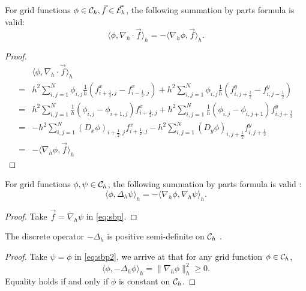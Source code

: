 \begin{proposition}
\label{prop:sbp}
    For grid functions $\phi \in{\mathcal{C}_h},\vec{f}\in {\vec{\mathcal{E}_h}}$, the following summation by parts formula is valid:
    \begin{equation}\label{eq:sbp}
        \langle \phi,\nabla_h \cdot \vec{f}\rangle_h=
        -\langle \nabla_h\phi, \vec{f}\rangle_h.
    \end{equation}
\end{proposition}
\begin{proof}
\begin{equation}
    \begin{aligned}
        &\langle \phi,\nabla_h \cdot \vec{f}\rangle_h \\    
        =&h^2\sum_{i,j=1}^N  \phi_{i,j}\frac{1}{h}(f^x_{i+\frac{1}{2},j}-f^x_{i-\frac{1}{2},j}
        )+h^2\sum_{i,j=1}^N \phi_{i,j}\frac{1}{h}(f^y_{i,j+\frac{1}{2}}-f^y_{i,j-\frac{1}{2}}
        )\\
        =&h^2\sum_{i,j=1}^N \frac{1}{h}(\phi_{i,j}-\phi_{i+1,j})f^x_{i+\frac{1}{2},j}+h^2\sum_{i,j=1}^N \frac{1}{h}(\phi_{i,j}-\phi_{i,j+1})f^y_{i,j+\frac{1}{2}}\\
        =&-h^2\sum_{i,j=1}^N (D_x \phi)_{i+\frac{1}{2},j}
        f^x_{i+\frac{1}{2},j}
        -h^2\sum_{i,j=1}^N (D_y \phi)_{i,j+\frac{1}{2}}
        f^y_{i,j+\frac{1}{2}}\\
        =&-\langle \nabla_h \phi, \vec{f} \rangle_h
    \end{aligned}
\end{equation}
    
\end{proof}
\begin{corollary}
    For grid functions $\phi,\psi\in{\mathcal{C}_h}$, the following summation by parts formula is valid \cite{morton1994numerical}:
    \begin{equation}\label{eq:sbp2}
        \langle \phi,\Delta_h \psi\rangle_h=
        -\langle \nabla_h\phi, \nabla_h \psi \rangle_h.
    \end{equation}
\end{corollary}
\begin{proof}
    Take $\vec{f}=\nabla_h \psi$ in \eqref{eq:sbp}.
\end{proof}
\begin{corollary}
    The discrete operator $-\Delta_h$ is positive semi-definite on ${\mathcal{C}_h}$ \cite{morton1994numerical}.
\end{corollary}
\begin{proof}
    Take $\psi=\phi$ in \eqref{eq:sbp2}, we arrive at that for any grid function $\phi \in {\mathcal{C}_h}$,
    \begin{equation}
        \langle \phi,-\Delta_h \phi\rangle_h=
        \|\nabla_h \phi\|_h^2\geq0.
    \end{equation}
    Equality holds if and only if $\phi$ is constant on ${\mathcal{C}_h}$.
\end{proof}